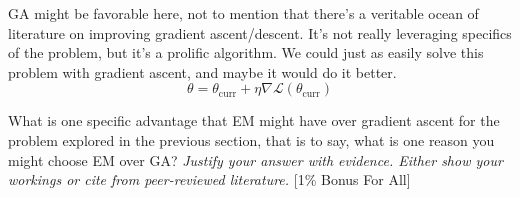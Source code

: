 \smallskip GA might be favorable here, not to mention that there's a veritable ocean of literature on improving gradient ascent/descent. It's not really leveraging specifics of the problem, but it's a prolific algorithm. We could just as easily solve this problem with gradient ascent, and maybe it would do it better.
$$\theta = \theta_{\text{curr}} + \eta\nabla \mathcal{L}(\theta_{\text{curr}})$$

\bigskip What is one specific advantage that EM might have over gradient ascent for the problem explored in the previous section, that is to say, what is one reason you might choose EM over GA? \emph{Justify your answer with evidence. Either show your workings or cite from peer-reviewed literature.} [1\% Bonus For All]
\newpage
